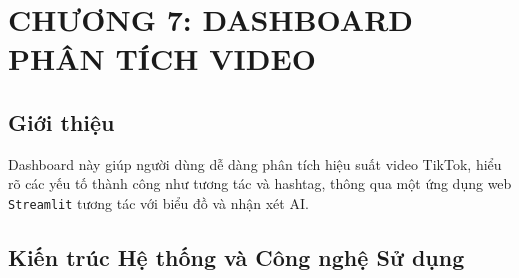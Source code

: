 \section{CHƯƠNG 7: DASHBOARD PHÂN TÍCH VIDEO}

\subsection{Giới thiệu}

Dashboard này giúp người dùng dễ dàng phân tích hiệu suất video TikTok, hiểu rõ các yếu tố thành công như tương tác và hashtag, thông qua một ứng dụng web \texttt{Streamlit} tương tác với biểu đồ và nhận xét AI.

\subsection{Kiến trúc Hệ thống và Công nghệ Sử dụng}

